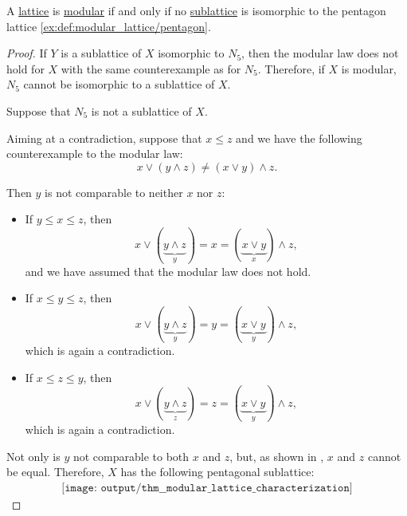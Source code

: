 \begin{proposition}\label{thm:modular_lattice_characterization}
  A \hyperref[def:lattice]{lattice} is \hyperref[def:modular_lattice]{modular} if and only if no \hyperref[def:lattice/submodel]{sublattice} is isomorphic to the pentagon lattice \eqref{ex:def:modular_lattice/pentagon}.
\end{proposition}
\begin{proof}
  \SufficiencySubProof If \( Y \) is a sublattice of \( X \) isomorphic to \( N_5 \), then the modular law does not hold for \( X \) with the same counterexample  as for \( N_5 \). Therefore, if \( X \) is modular, \( N_5 \) cannot be isomorphic to a sublattice of \( X \).

  \NecessitySubProof Suppose that \( N_5 \) is not a sublattice of \( X \).

  Aiming at a contradiction, suppose that \( x \leq z \) and we have the following counterexample to the modular law:
  \begin{equation*}
    x \vee (y \wedge z) \neq (x \vee y) \wedge z.
  \end{equation*}

  Then \( y \) is not comparable to neither \( x \) nor \( z \):
  \begin{itemize}
    \item If \( y \leq x \leq z \), then
    \begin{equation*}
      x \vee (\underbrace{y \wedge z}_{y}) = x = (\underbrace{x \vee y}_{x}) \wedge z,
    \end{equation*}
    and we have assumed that the modular law does not hold.

    \item If \( x \leq y \leq z \), then
    \begin{equation*}
      x \vee (\underbrace{y \wedge z}_{y}) = y = (\underbrace{x \vee y}_{y}) \wedge z,
    \end{equation*}
    which is again a contradiction.

    \item If \( x \leq z \leq y \), then
    \begin{equation*}
      x \vee (\underbrace{y \wedge z}_{z}) = z = (\underbrace{x \vee y}_{y}) \wedge z,
    \end{equation*}
    which is again a contradiction.
  \end{itemize}

  Not only is \( y \) not comparable to both \( x \) and \( z \), but, as shown in , \( x \) and \( z \) cannot be equal. Therefore, \( X \) has the following pentagonal sublattice:
  \begin{equation}\label{eq:thm:modular_lattice_characterization/pentagonal}
    \begin{aligned}
      \texttt{[image: output/thm\_\_modular\_lattice\_characterization]}
    \end{aligned}
  \end{equation}


\end{proof}
